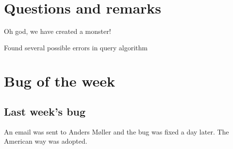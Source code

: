 \documentclass[a4paper,11pt,agenda,chair]{meetingmins}
\begin{document}
\section{Questions and remarks}
\begin{items}
	\item Oh god, we have created a monster!
	\item Found several possible errors in query algorithm
\end{items}



\section{Bug of the week}
\subsection{Last week's bug}
An email was sent to Anders M\o ller and the bug was fixed a day later. The American way was adopted.
\end{document}

